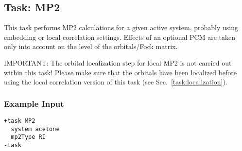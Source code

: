 \documentclass[bibliography=totocnumbered,a4paper,10pt,oneside]{scrbook}
\begin{document}
\clearpage
\subsection{Task: MP2}\label{task: mp2}
\label{sec:MP2}
This task performs MP2 calculations for a given active system, probably using embedding or local correlation
settings. Effects of an optional PCM are taken only into account on the level of the orbitals/Fock matrix.

{\color{red}IMPORTANT:} The orbital localization step for local MP2 is not carried out
within this task! Please make sure that the orbitals have been localized before using the local
correlation version of this task (see Sec.~\ref{task:localization}).
\subsubsection{Example Input}
\begin{lstlisting}
+task MP2
  system acetone
  mp2Type RI
-task
\end{lstlisting}
\end{document}
